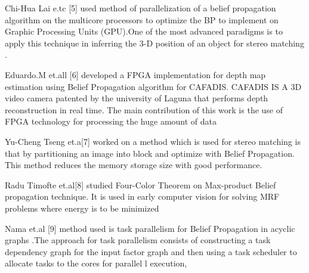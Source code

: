 Chi-Hua Lai e.tc [5] used  method of  parallelization of a belief propagation algorithm on the multicore processors  to optimize the BP  to implement on Graphic Processing Units (GPU).One of the most advanced paradigms is to apply this  technique in inferring the 3-D position of an object for stereo matching .


 Eduardo.M et.all [6] developed a FPGA implementation for depth map estimation using Belief Propagation algorithm for CAFADIS. CAFADIS IS A 3D video camera  patented  by the university of Laguna that performs depth reconstruction in real time.
The main contribution of this work is the use of FPGA technology for processing the huge amount of data



Yu-Cheng Tseng et.a[7]  worked on  a method which is  used  for stereo matching is that by partitioning an image into block and optimize with Belief Propagation. This method reduces the memory storage size with good performance.





Radu  Timofte et.al[8] studied Four-Color Theorem  on Max-product Belief propagation technique. It is used in early computer vision for solving MRF problems where energy is to be minimized

Nama et.al [9]  method used is task parallelism for Belief Propagation in acyclic graphs .The approach for task parallelism consists of constructing a task dependency graph for the input factor graph and then using a task scheduler to allocate tasks to the cores for parallel l execution,

